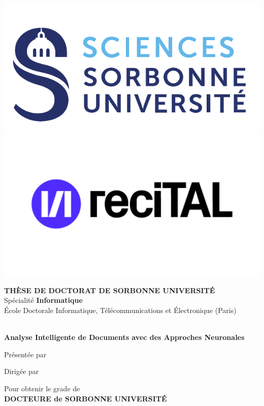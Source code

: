 \begin{titlepage}

\vspace*{-2.5cm}
\includegraphics[height=0.15\columnwidth]{images/sorbonne}
\vspace*{0.5cm}
\hspace*{5.5cm}
\includegraphics[height=0.15\columnwidth]{images/recital-logo-new.pdf}
\vspace*{0.5cm}

\begin{center}

{\large \textbf{T\normalsize{HÈSE DE}\large{} D\normalsize{OCTORAT DE}\large{} S\normalsize{ORBONNE}\large{} U\normalsize{NIVERSITÉ}}}\\
Spécialité \textbf{Informatique}\\ 
École Doctorale Informatique, Télécommunications et Électronique (Paris)

\vspace*{1.5cm}

{\Large \textbf{\myTitleFront}} \\[0.5em]
{\large \textbf{Analyse Intelligente de Documents avec des Approches Neuronales}}

\vspace*{1.2cm}

Présentée par\\
{\large \textbf{\myName}}

\vspace*{2mm}

Dirigée par\\
\textbf{\myProf}

\vspace*{5mm}

Pour obtenir le grade de \ \\
\textbf{DOCTEURE de SORBONNE UNIVERSITÉ} \ \\


\end{center}
\end{titlepage}
